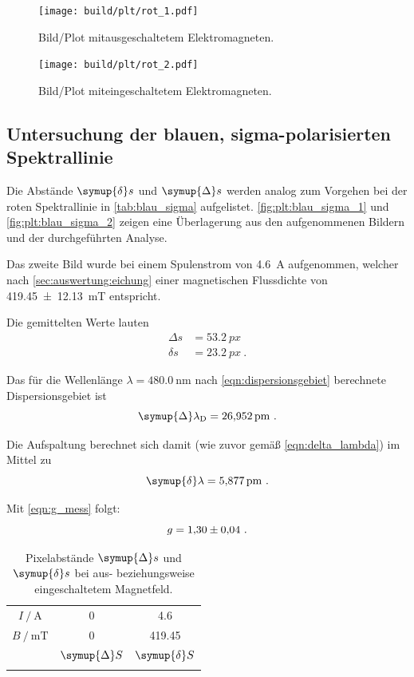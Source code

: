 \begin{figure}[H]
    \centering
    \texttt{[image: build/plt/rot\_1.pdf]}
    \caption{Bild/Plot mitausgeschaltetem Elektromagneten.}
    \label{fig:plt:rot_1}
\end{figure}

\begin{figure}[H]
    \centering
    \texttt{[image: build/plt/rot\_2.pdf]}
    \caption{Bild/Plot miteingeschaltetem Elektromagneten.}
    \label{fig:plt:rot_2}
\end{figure}


\FloatBarrier
\subsection{Untersuchung der blauen, sigma-polarisierten Spektrallinie} \label{sec:auswertung:blau_sigma}
Die Abstände $\symup{\delta} s$ und $\symup{\Delta} s$ werden analog zum Vorgehen bei der roten Spektrallinie
in \autoref{tab:blau_sigma} aufgelistet.
\autoref{fig:plt:blau_sigma_1} und \autoref{fig:plt:blau_sigma_2} zeigen eine Überlagerung
aus den aufgenommenen Bildern und der durchgeführten Analyse.

Das zweite Bild wurde bei einem Spulenstrom von \SI{4.6}{\ampere} aufgenommen,
welcher nach \autoref{sec:auswertung:eichung} einer magnetischen Flussdichte von \SI{419.45 \pm 12.13}{\milli\tesla} entspricht.

Die gemittelten Werte lauten
\begin{align*}
    Δs &= \SI{53.2}{px} \\
    δs &= \SI{23.2}{px} \ .
\end{align*}


Das für die Wellenlänge $\lambda = \SI{480.0}{\nano\meter}$ nach \autoref{eqn:dispersionsgebiet} berechnete Dispersionsgebiet ist
\[
    \symup{\Delta}\lambda_\text{D} = \SI{26.952}{\pico\meter} \ .
\]

Die Aufspaltung berechnet sich damit (wie zuvor gemäß \autoref{eqn:delta_lambda}) im Mittel zu
\[
    \symup{\delta} \lambda = \SI{5.877}{\pico\meter} \ .
\]

Mit \autoref{eqn:g_mess} folgt:
\[
    g = \num{1.30 \pm 0.04} \ .
\]

\begin{table}[H]
    \centering
    \caption{Pixelabstände $\symup{\Delta} s$ und $\symup{\delta} s$ bei aus- beziehungsweise eingeschaltetem Magnetfeld.}
    \label{tab:blau_sigma}
    \begin{tabular}{S S S}
        \toprule
        {$I \mathbin{/} \si{\ampere}$} & 0 & 4.6 \\
        {$B \mathbin{/} \si{\milli\tesla}$} & 0 & 419.45  \\
        \midrule
        & {$\symup{\Delta} S$} & {$\symup{\delta} S$} \\
        \midrule
        \bottomrule
    \end{tabular}
\end{table}

